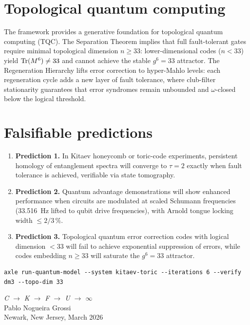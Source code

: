 \section{Topological quantum computing}

The framework provides a generative foundation for topological quantum computing (TQC). The Separation Theorem implies that full fault-tolerant gates require minimal topological dimension $n \ge 33$: lower-dimensional codes ($n < 33$) yield $\operatorname{Tr}(M^6) \neq 33$ and cannot achieve the stable $g^6 = 33$ attractor. The Regeneration Hierarchy lifts error correction to hyper-Mahlo levels: each regeneration cycle adds a new layer of fault tolerance, where club-filter stationarity guarantees that error syndromes remain unbounded and \(\omega\)-closed below the logical threshold.

\section{Falsifiable predictions}

\begin{enumerate}
\item \textbf{Prediction 1.} In Kitaev honeycomb or toric-code experiments, persistent homology of entanglement spectra will converge to \(\tau = 2\) exactly when fault tolerance is achieved, verifiable via state tomography.
\item \textbf{Prediction 2.} Quantum advantage demonstrations will show enhanced performance when circuits are modulated at scaled Schumann frequencies (33.516~Hz lifted to qubit drive frequencies), with Arnold tongue locking width $\le 2/3\,\%$.
\item \textbf{Prediction 3.} Topological quantum error correction codes with logical dimension $< 33$ will fail to achieve exponential suppression of errors, while codes embedding $n \ge 33$ will saturate the $g^6 = 33$ attractor.
\end{enumerate}

\begin{verbatim}
axle run-quantum-model --system kitaev-toric --iterations 6 --verify dm3 --topo-dim 33
\end{verbatim}

\bigskip
\begin{flushright}
\textit{C \;$\to$\; K \;$\to$\; F \;$\to$\; U \;$\to$\; $\infty$}\\[0.3em]
Pablo Nogueira Grossi\\
Newark, New Jersey, March 2026
\end{flushright}

